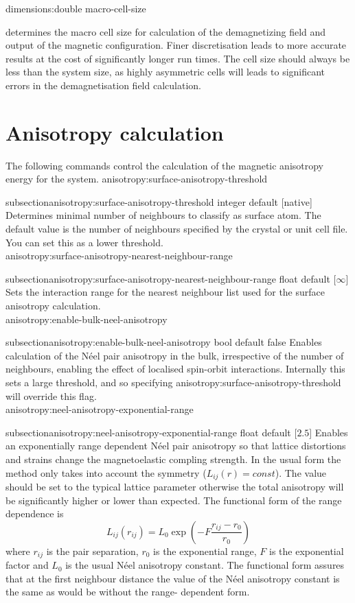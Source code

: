 {\zicf dimensions:double macro-cell-size} determines the macro cell size for calculation of the demagnetizing field and output of the magnetic configuration. Finer discretisation leads to more accurate results at the cost of significantly longer run times. The cell size should always be less than the system size, as highly asymmetric cells will leads to significant errors in the demagnetisation field calculation.

\section*{Anisotropy calculation}
The following commands control the calculation of the magnetic anisotropy energy for the system.
{\zicf anisotropy:surface-anisotropy-threshold}
{subsection}{anisotropy:surface-anisotropy-threshold}
  integer default [native]
  Determines minimal number of neighbours to classify as surface atom. The
  default value is the number of neighbours specified by the crystal or unit cell
  file. You can set this as a lower threshold. \\

{\zicf anisotropy:surface-anisotropy-nearest-neighbour-range}
{subsection}{anisotropy:surface-anisotropy-nearest-neighbour-range}
  float default [$\infty$]
  Sets the interaction range for the nearest neighbour list used for the surface
  anisotropy calculation.\\

{\zicf anisotropy:enable-bulk-neel-anisotropy}
{subsection}{anisotropy:enable-bulk-neel-anisotropy}
  bool default false
  Enables calculation of the N\'eel pair anisotropy in the bulk, irrespective of
  the number of neighbours, enabling the effect of localised spin-orbit
  interactions. Internally this sets a large threshold, and so specifying
  anisotropy:surface-anisotropy-threshold will override this flag.\\

{\zicf anisotropy:neel-anisotropy-exponential-range}
{subsection}{anisotropy:neel-anisotropy-exponential-range}
  float default [$2.5$]
  Enables an exponentially range dependent N\'eel pair anisotropy so that
  lattice distortions and strains change the magnetoelastic compling strength.
  In the usual form the method only takes into account the symmetry ($L_{ij}(r)
  = const$). The value should be set to the typical lattice parameter otherwise
  the total anisotropy will be significantly higher or lower than expected. The
  functional form of the range dependence is
  \begin{equation}
     L_{ij}(r_{ij}) = L_0 \exp\left(-F\frac{r_{ij} - r_0}{r_{0}}\right)
  \end{equation}
  where $r_{ij}$ is the pair separation, $r_0$ is the exponential range,
  $F$ is the exponential factor and $L_0$ is the usual N\'eel anisotropy constant.
  The functional form assures that at the first neighbour distance the value of
  the N\'eel anisotropy constant is the same as would be without the range-
  dependent form.\\

